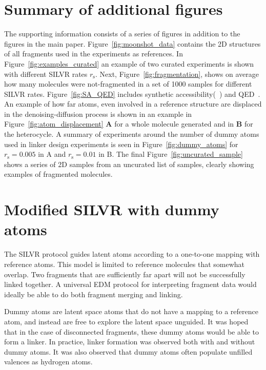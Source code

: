 \documentclass[journal=jacsat,manuscript=article]{achemso}
\begin{document}
\newpage 
\begin{suppinfo}

\section{Summary of additional figures }
The supporting information consists of a series of figures in addition to the figures in the main paper. Figure~\ref{fig:moonshot_data} contains the 2D structures of all fragments used in the experiments as references. In Figure~\ref{fig:examples_curated} an example of two curated experiments is shown with different SILVR rates $r_{\mathrm{s}}$. Next, Figure~\ref{fig:fragmentation}, shows on average how many molecules were not-fragmented in a set of 1000 samples for different SILVR rates. Figure~\ref{fig:SA_QED} includes synthetic accessibility(~\cite{ertl2009estimation}) and QED~\cite{bickerton2012quantifying, wildman1999prediction}. An example of how far atoms, even involved in a reference structure are displaced in the denoising-diffusion process is shown in an example in Figure~\ref{fig:atom_displacement} \textbf{A} for a whole molecule generated and in \textbf{B} for the heterocycle. A summary of experiments around the number of dummy atoms used in linker design experiments is seen in Figure~\ref{fig:dummy_atoms} for $r_{\mathrm{s}}=0.005$ in A and $r_{\mathrm{s}}=0.01$ in B.  The final Figure~\ref{fig:uncurated_sample} shows a series of 2D samples from an uncurated list of samples, clearly showing examples of fragmented molecules.  


\section{Modified SILVR with dummy atoms}
The SILVR protocol guides latent atoms according to a one-to-one mapping with reference atoms. This model is limited to reference molecules that somewhat overlap. Two fragments that are sufficiently far apart will not be successfully linked together. A universal EDM protocol for interpreting fragment data would ideally be able to do both fragment merging and linking.

Dummy atoms are latent space atoms that do not have a mapping to a reference atom, and instead are free to explore the latent space unguided. It was hoped that in the case of disconnected fragments, these dummy atoms would be able to form a linker. In practice, linker formation was observed both with and without dummy atoms. It was also observed that dummy atoms often populate unfilled valences as hydrogen atoms. 


\end{suppinfo}
\end{document}
